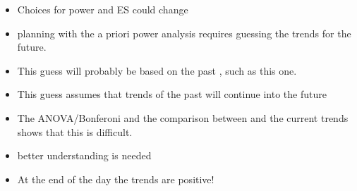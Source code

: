 \begin{itemize}
\begin{itemize}
	\end{itemize}
	\item Choices for power and ES could change
	\item planning with the a priori power analysis requires guessing the trends for the future.  %
	\item This guess will probably be based on the past , such as this one.
	\item This guess assumes that trends of the past will continue into the future
	\item The ANOVA/Bonferoni and the comparison between \citep{robinson2008ph} and the current trends shows that this is difficult.
	\item better understanding is needed
	\item At the end of the day the trends are positive!
\end{itemize}
	
